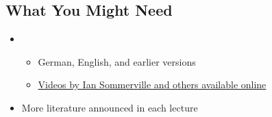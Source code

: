 \subsection{What You Might Need}

\begin{frame}{\insertsubsection}
	\begin{fancycolumns}[animation=none]
		\centering{}
		\nextcolumn
		\begin{definition}{\mysource{\sommerville}}
			\begin{itemize}
				\item {}
				\begin{itemize}
					\item German, English, and earlier versions
					\item \href{https://software-engineering-book.com/videos/}{Videos by Ian Sommerville and others available online}
				\end{itemize}
				\item More literature announced in each lecture
			\end{itemize}
		\end{definition}
	\end{fancycolumns}
\end{frame}

%
%
%
%
